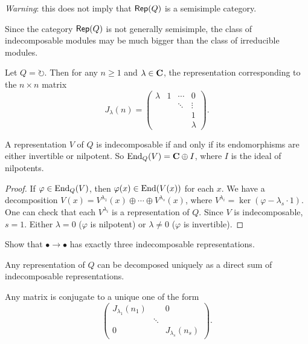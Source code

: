 \documentclass{article}
\begin{document}
\emph{Warning}: this does not imply that $\operatorname{\mathsf{Rep}}(Q)$ is a 
semisimple category. 



Since the category $\operatorname{\mathsf{Rep}}(Q)$ is not generally semisimple, 
the class of indecomposable modules may be much bigger than the class of 
irreducible modules. 

\begin{example}
Let $Q=\circlearrowright$. Then for any $n\geqslant 1$ and 
$\lambda\in \mathbf{C}$, the representation corresponding to the $n\times n$ matrix 
\[
  J_\lambda(n) = 
  \begin{pmatrix}
    \lambda & 1 & \cdots & 0\\
    & & \ddots & \vdots \\
    & & & 1 \\
    & & & \lambda
  \end{pmatrix} .
\]
\end{example}

\begin{lemma}\label{lem:inv-nil}
A representation $V$ of $Q$ is indecomposable if and only if its endomorphisms 
are either invertible or nilpotent. So $\operatorname{End}_Q(V) = \mathbf{C}\oplus I$, where $I$ is 
the ideal of nilpotents. 
\end{lemma}
\begin{proof}
If $\varphi\in \operatorname{End}_Q(V)$, then $\varphi(x)\in \operatorname{End}(V(x))$ for each $x$. 
We have a decomposition 
$V(x) = V^{\lambda_1}(x) \oplus \cdots \oplus V^{\lambda_s}(x)$, where 
$V^{\lambda_i} = \ker(\varphi-\lambda_s\cdot 1)$. One can check that each 
$V^{\lambda_i}$  is a representation of $Q$. Since $V$ is indecomposable, 
$s=1$. Either $\lambda=0$ ($\varphi$ is nilpotent) or $\lambda\ne 0$ 
($\varphi$ is invertible). 
\end{proof}

\begin{exercise}
Show that $\bullet \to \bullet$ has exactly three indecomposable 
representations. 
\end{exercise}

\begin{theorem}\label{thm:krull-schmidt}
Any representation of $Q$ can be decomposed uniquely as a direct sum of 
indecomposable representations. 
\end{theorem}

\begin{corollary}[Jordan]
Any matrix is conjugate to a unique one of the form 
\[
  \begin{pmatrix}
    J_{\lambda_1}(n_1) & & 0\\
    & \ddots \\
    0 & & J_{\lambda_s}(n_s) 
  \end{pmatrix} .
\]
\end{corollary}
\end{document}
